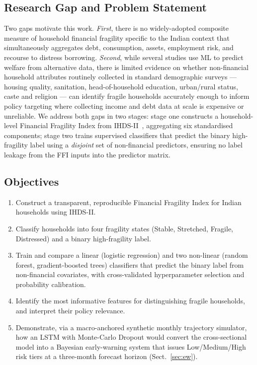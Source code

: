 \documentclass[colorlinks,balance]{asmeconf}
\begin{document}
\subsection{Research Gap and Problem Statement}
Two gaps motivate this work. \textit{First}, there is no widely-adopted composite measure of household financial fragility specific to the Indian context that simultaneously aggregates debt, consumption, assets, employment risk, and recourse to distress borrowing. \textit{Second}, while several studies use ML to predict welfare from alternative data, there is limited evidence on whether non-financial household attributes routinely collected in standard demographic surveys --- housing quality, sanitation, head-of-household education, urban/rural status, caste and religion --- can identify fragile households accurately enough to inform policy targeting where collecting income and debt data at scale is expensive or unreliable. We address both gaps in two stages: stage one constructs a household-level Financial Fragility Index from IHDS-II~\cite{ihds2}, aggregating six standardised components; stage two trains supervised classifiers that predict the binary high-fragility label using a \emph{disjoint} set of non-financial predictors, ensuring no label leakage from the FFI inputs into the predictor matrix.

\subsection{Objectives}
\begin{enumerate}
\item Construct a transparent, reproducible Financial Fragility Index for Indian households using IHDS-II.
\item Classify households into four fragility states (Stable, Stretched, Fragile, Distressed) and a binary high-fragility label.
\item Train and compare a linear (logistic regression) and two non-linear (random forest, gradient-boosted trees) classifiers that predict the binary label from non-financial covariates, with cross-validated hyperparameter selection and probability calibration.
\item Identify the most informative features for distinguishing fragile households, and interpret their policy relevance.
\item Demonstrate, via a macro-anchored synthetic monthly trajectory simulator, how an LSTM with Monte-Carlo Dropout would convert the cross-sectional model into a Bayesian early-warning system that issues Low/Medium/High risk tiers at a three-month forecast horizon (Sect.~\ref{sec:ew}).
\end{enumerate}
\end{document}
